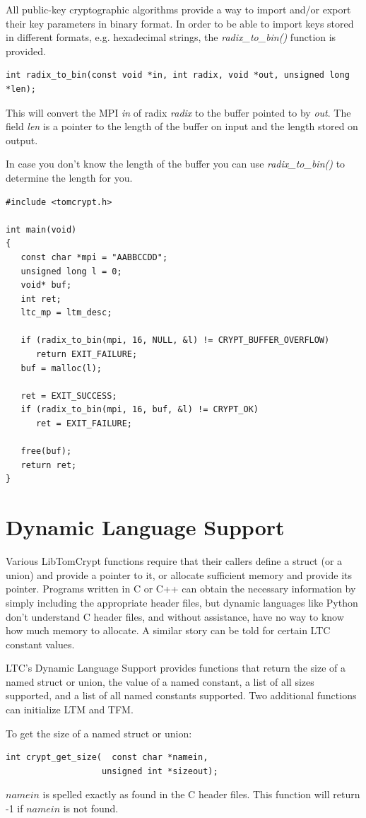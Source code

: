 \documentclass[synpaper]{book}
\newcommand{\mysection}[1]    %
	{                   %
	\section{#1}
   \markboth{\textsf{www.libtom.net}}{\thesection ~ {#1}}
	}
\begin{document}
All public-key cryptographic algorithms provide a way to import and/or export their key parameters in binary format.
In order to be able to import keys stored in different formats, e.g. hexadecimal strings, the \textit{radix\_to\_bin()} function is provided.

\begin{verbatim}
int radix_to_bin(const void *in, int radix, void *out, unsigned long *len);
\end{verbatim}

This will convert the MPI \textit{in} of radix \textit{radix} to the buffer pointed to by \textit{out}.
The field \textit{len} is a pointer to the length of the buffer on input and the length stored on output.

In case you don't know the length of the buffer you can use \textit{radix\_to\_bin()} to determine the length for you.

\begin{verbatim}
#include <tomcrypt.h>

int main(void)
{
   const char *mpi = "AABBCCDD";
   unsigned long l = 0;
   void* buf;
   int ret;
   ltc_mp = ltm_desc;

   if (radix_to_bin(mpi, 16, NULL, &l) != CRYPT_BUFFER_OVERFLOW)
      return EXIT_FAILURE;
   buf = malloc(l);

   ret = EXIT_SUCCESS;
   if (radix_to_bin(mpi, 16, buf, &l) != CRYPT_OK)
      ret = EXIT_FAILURE;

   free(buf);
   return ret;
}
\end{verbatim}


\mysection{Dynamic Language Support}
Various LibTomCrypt functions require that their callers define a struct
(or a union) and provide a pointer to it, or allocate sufficient memory and
provide its pointer.  Programs written in C or C++ can obtain the necessary
information by simply including the appropriate header files, but dynamic
languages like Python don't understand C header files, and without assistance,
have no way to know how much memory to allocate.  A similar story can be told
for certain LTC constant values.

LTC's Dynamic Language Support provides functions that return the size of
a named struct or union, the value of a named constant, a list of all sizes
supported, and a list of all named constants supported.  Two additional
functions can initialize LTM and TFM.

To get the size of a named struct or union:
\begin{verbatim}
int crypt_get_size(  const char *namein,
                   unsigned int *sizeout);
\end{verbatim}
$namein$ is spelled exactly as found in the C header files.  This function will
return -1 if $namein$ is not found.
\end{document}
